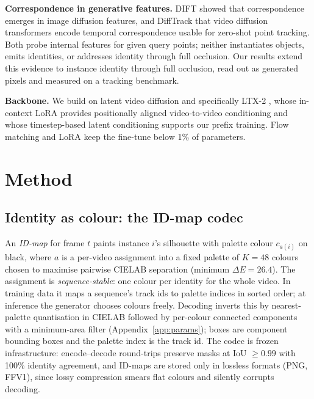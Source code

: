 \documentclass{article} %
\newcommand{\rev}[1]{#1}
\begin{document}
\textbf{Correspondence in generative features.} DIFT \citep{tang2023dift} showed that
correspondence emerges in image diffusion features, and DiffTrack \citep{nam2025difftrack}
that video diffusion transformers encode temporal correspondence usable for zero-shot
point tracking. \rev{Both probe internal features for given query points; neither
instantiates objects, emits identities, or addresses identity through full occlusion.}
Our results extend this evidence to instance identity through full
occlusion, read out as generated pixels and measured on a tracking benchmark.

\textbf{Backbone.} We build on latent video diffusion \citep{rombach2022ldm,ho2022video}
and specifically LTX-2 \citep{hacohen2026ltx2,hacohen2024ltxvideo}, whose in-context LoRA
\citep{huang2024iclora} provides positionally aligned video-to-video conditioning and
whose timestep-based latent conditioning supports our prefix training. Flow matching
\citep{lipman2022flow} and LoRA \citep{hu2021lora} keep the fine-tune below 1\% of
parameters.

\section{Method}

\subsection{Identity as colour: the ID-map codec}
\label{sec:codec}

An \emph{ID-map} for frame $t$ paints instance $i$'s silhouette with palette colour
$c_{a(i)}$ on black, where $a$ is a per-video assignment into a fixed palette of $K{=}48$
colours chosen to maximise pairwise CIELAB separation (minimum $\Delta E = 26.4$). The
assignment is \emph{sequence-stable}: one colour per identity for the whole video. In
training data it maps a sequence's track ids to palette indices in sorted order; at
inference the generator chooses colours freely. Decoding inverts this by nearest-palette
quantisation in CIELAB followed by per-colour connected components with a minimum-area
filter (Appendix~\ref{app:params}); boxes are component bounding boxes and the palette
index is the track id. The codec
is frozen infrastructure: encode--decode round-trips preserve masks at IoU $\geq 0.99$ with
100\% identity agreement, and ID-maps are stored only in lossless formats (PNG, FFV1),
since lossy compression smears flat colours and silently corrupts decoding.
\end{document}
